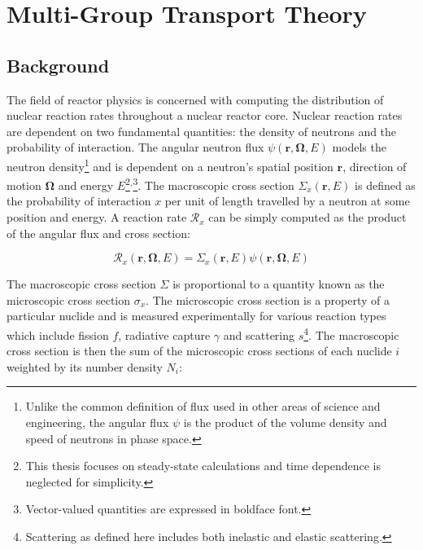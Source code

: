 \chapter{Multi-Group Transport Theory}
\label{chap:mgxs}


\section{Background}
\label{sec:chap2-background}

The field of reactor physics is concerned with computing the distribution of nuclear reaction rates throughout a nuclear reactor core. Nuclear reaction rates are dependent on two fundamental quantities: the density of neutrons and the probability of interaction. The angular neutron flux $\psi(\mathbf{r},\mathbf{\Omega},E)$ models the neutron density\footnote{Unlike the common definition of flux used in other areas of science and engineering, the angular flux $\psi$ is the product of the volume density and speed of neutrons in phase space.} and is dependent on a neutron's spatial position $\mathbf{r}$, direction of motion $\mathbf{\Omega}$ and energy $E$\footnote{This thesis focuses on steady-state calculations and time dependence is neglected for simplicity.}$^{,}$\footnote{Vector-valued quantities are expressed in boldface font.}. The macroscopic cross section $\Sigma_{x}(\mathbf{r},E)$ is defined as the probability of interaction $x$ per unit of length travelled by a neutron at some position and energy. A reaction rate $\mathcal{R}_{x}$ can be simply computed as the product of the angular flux and cross section:

\begin{dmath}
\label{eqn:chap2-rxn-rates}
\mathcal{R}_{x}(\mathbf{r},\mathbf{\Omega},E) = \Sigma_{x}(\mathbf{r},E) \psi(\mathbf{r},\mathbf{\Omega},E)
\end{dmath}


The macroscopic cross section $\Sigma$ is proportional to a quantity known as the microscopic cross section $\sigma_{x}$. The microscopic cross section is a property of a particular nuclide and is measured experimentally for various reaction types which include fission $f$, radiative capture $\gamma$ and scattering $s$\footnote{Scattering as defined here includes both inelastic and elastic scattering.}. The macroscopic cross section is then the sum of the microscopic cross sections of each nuclide $i$ weighted by its number density $N_{i}$:

